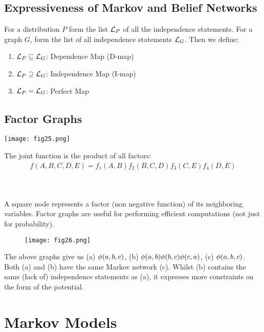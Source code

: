 \subsection{Expressiveness of Markov and Belief Networks}

For a distribution $P$ form the list $\mathcal{L}_P$ of all the independence statements. For a graph $G$, form the list of all independence statements $\mathcal{L}_G$. Then we define:
\begin{enumerate}
	\item $\mathcal{L}_P\subseteq\mathcal{L}_G$: Dependence Map (D-map)
	\item $\mathcal{L}_P\supseteq\mathcal{L}_G$: Independence Map (I-map)
	\item $\mathcal{L}_P=\mathcal{L}_G$: Perfect Map
\end{enumerate}

\subsection{Factor Graphs}

\begin{minipage}{0.4\textwidth}
	\centering
	\texttt{[image: fig25.png]}
\end{minipage}
\begin{minipage}{0.6\textwidth}
	The joint function is the product of all factors:
	\begin{align*}
	f(A,B,C,D,E)=f_1(A,B)f_2(B,C,D)f_3(C,E)f_4(D,E)
	\end{align*}
\end{minipage}
\\ \\
A square node represents a factor (non negative function) of its neighboring variables. Factor graphs are useful for performing efficient computations (not just for probability).
\begin{figure*}[h]
	\centering
	\texttt{[image: fig26.png]}
\end{figure*}

The above graphs give us (a) $\phi(a,b,c)$, (b) $\phi(a,b)\phi(b,c)\phi(c,a)$, (c) $\phi(a,b,c)$. Both (a) and (b) have the same Markov network (c). Whilst (b) contains the same (lack of) independence statements as (a), it expresses more constraints on the form of the potential.



\section{Markov Models}
\label{section12.4}

